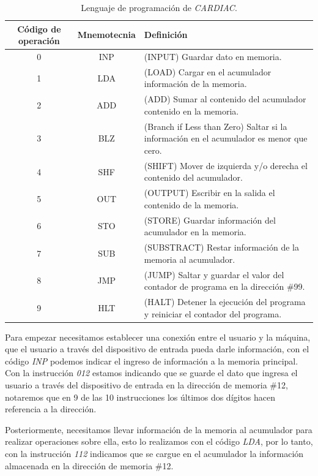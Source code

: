 \documentclass[letterpaper,12pt,oneside]{book}
\begin{document}
	
	\begin{table}[h]
	  \centering
	  \begin{tabular}{|c|c|p{8cm}|}
	    \hline
    	\textbf{Código de operación} & \textbf{Mnemotecnia} & \textbf{Definición} \\
	    \hline
	    0 & INP & (INPUT) Guardar dato en memoria.\\
	    \hline
		1 & LDA & (LOAD)  Cargar en el acumulador información de la memoria.\\
		\hline
	    2 & ADD & (ADD)  Sumar al contenido del acumulador contenido en la memoria.\\
	    \hline
	    3 & BLZ & (Branch if Less than Zero) Saltar si la información en el acumulador es menor que cero.\\
	    \hline
	    4 & SHF & (SHIFT) Mover de izquierda y/o derecha el contenido del acumulador.\\
	    \hline
	    5 & OUT & (OUTPUT) Escribir en la salida el contenido de la memoria.\\
	    \hline
	    6 & STO & (STORE) Guardar información del acumulador en la memoria.\\
	    \hline
	    7 & SUB & (SUBSTRACT) Restar información de la memoria al acumulador.\\
	    \hline
	    8 & JMP & (JUMP) Saltar y guardar el valor del contador de programa en la dirección \#99. \\
	    \hline
	    9 & HLT & (HALT) Detener la ejecución del programa y reiniciar el contador del programa.\\
	    \hline
	  \end{tabular}
	  \caption{Lenguaje de programación de \textit{CARDIAC}.}
	  \label{tab:simple-table}
	\end{table}
	
	Para empezar necesitamos establecer una conexión entre el usuario y la máquina, que el usuario a través del dispositivo de entrada pueda
	darle información, con el código \textit{INP} podemos indicar el ingreso de información a la memoria principal. Con la instrucción  	
	\textit{012} estamos indicando que se guarde el dato que ingresa el usuario a través del dispositivo
	de entrada en la dirección de memoria \#12, notaremos que en 9 de las 10 instrucciones los últimos dos dígitos hacen referencia a la dirección.
 
	Posteriormente, necesitamos llevar información de la memoria al acumulador para realizar operaciones sobre ella, esto lo realizamos con el código 
	\textit{LDA}, por lo tanto, con la instrucción
	\textit{112} indicamos que se cargue en el acumulador la información almacenada en la dirección de memoria \#12.
 
\end{document}
